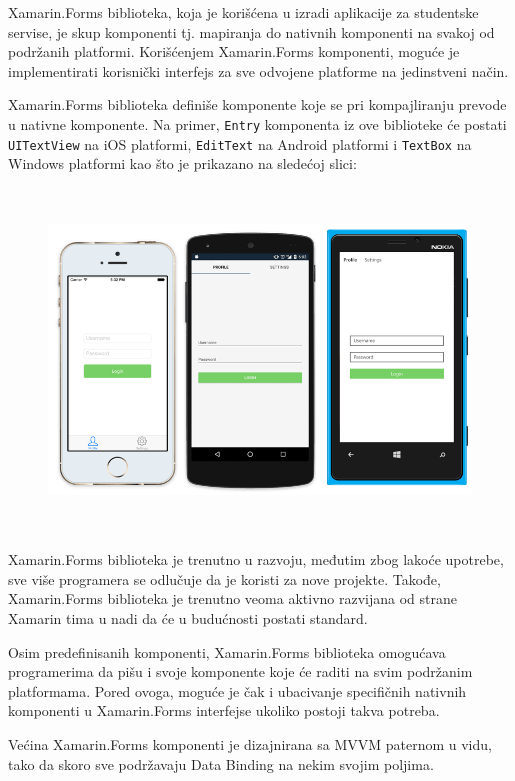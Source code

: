 \documentclass[a4paper]{article}
\begin{document}
Xamarin.Forms biblioteka, koja je korišćena u izradi aplikacije za
studentske servise, je skup komponenti tj. mapiranja do nativnih
komponenti na svakoj od podržanih platformi. Korišćenjem Xamarin.Forms
komponenti, moguće je implementirati korisnički interfejs za sve
odvojene platforme na jedinstveni način.

Xamarin.Forms biblioteka definiše komponente koje se pri kompajliranju
prevode u nativne komponente. Na primer,
\texttt{\textcolor[rgb]{0.0,0.4,0.8}{Entry}} komponenta iz ove
biblioteke će postati \texttt{\textcolor[rgb]{0.0,0.4,0.8}{UITextView}}
na iOS platformi, \texttt{\textcolor[rgb]{0.0,0.4,0.8}{EditText}} na
Android platformi i \texttt{\textcolor[rgb]{0.0,0.4,0.8}{TextBox}} na
Windows platformi kao što je prikazano na sledećoj slici: 



\begin{figure}
\centering
\includegraphics[width=142.12mm,height=90.95mm]{msc-img12.png}
\end{figure}
Xamarin.Forms biblioteka je trenutno u razvoju, međutim zbog lakoće
upotrebe, sve više programera se odlučuje da je koristi za nove
projekte. Takođe, Xamarin.Forms biblioteka je trenutno veoma aktivno
razvijana od strane Xamarin tima u nadi da će u budućnosti postati
standard.

Osim predefinisanih komponenti, Xamarin.Forms biblioteka omogućava
programerima da pišu i svoje komponente koje će raditi na svim
podržanim platformama. Pored ovoga, moguće je čak i ubacivanje
specifičnih nativnih komponenti u Xamarin.Forms interfejse ukoliko
postoji takva potreba.

Većina Xamarin.Forms komponenti je dizajnirana sa MVVM paternom u vidu,
tako da skoro sve podržavaju Data Binding na nekim svojim poljima.
\end{document}
